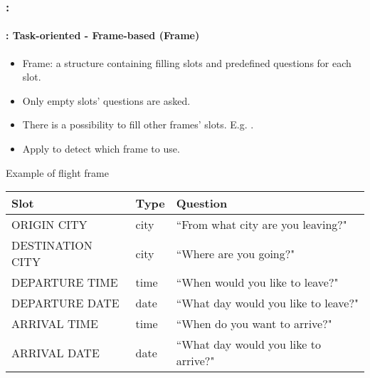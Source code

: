 \documentclass[xcolor=table]{beamer}
\begin{document}
\begin{frame}
	\frametitle{\insertshortsubtitle: \insertsection}
	\framesubtitle{\insertsubsection: Task-oriented - Frame-based (Frame)}
	
	\begin{itemize}
		\item Frame: a structure containing filling slots and predefined questions for each slot.
		\item Only empty slots' questions are asked.
		\item There is a possibility to fill other frames' slots. 
		E.g. .
		\item Apply  to detect which frame to use.
	\end{itemize}

	\begin{exampleblock}{Example of flight frame \cite{2020-jurafsky-martin}}
		\centering\tiny\bfseries
		\begin{tabular}{lll}
			\hline\hline
			Slot & Type & Question \\
			\hline
			ORIGIN CITY & city & ``From what city are you leaving?" \\
			DESTINATION CITY & city & ``Where are you going?" \\
			DEPARTURE TIME & time & ``When would you like to leave?" \\
			DEPARTURE DATE & date & ``What day would you like to leave?" \\
			ARRIVAL TIME & time & ``When do you want to arrive?" \\
			ARRIVAL DATE & date & ``What day would you like to arrive?" \\
			\hline\hline
		\end{tabular}
	\end{exampleblock}
	
\end{frame}
\end{document}

